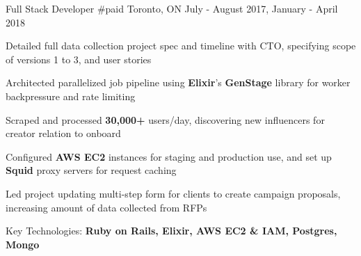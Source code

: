 

\begin{cventries}

  \cventry
    {Full Stack Developer} %
    {\#paid} %
    {Toronto, ON} %
    {July - August 2017, January - April 2018} %
    {
      \begin{cvitems} %
        \item {Detailed full data collection project spec and timeline with CTO, specifying scope of versions 1 to 3, and user stories}
        \item {Architected parallelized job pipeline using \textbf{Elixir}'s \textbf{GenStage} library for worker backpressure and rate limiting}
        \item {Scraped and processed \textbf{30,000+} users/day, discovering new influencers for creator relation to onboard}
        \item {Configured \textbf{AWS EC2} instances for staging and production use, and set up \textbf{Squid} proxy servers for request caching}
        \item {Led project updating multi-step form for clients to create campaign proposals, increasing amount of data collected from RFPs}
        \item {Key Technologies: \textbf{Ruby on Rails, Elixir, AWS EC2 \& IAM, Postgres, Mongo}}
      \end{cvitems}
    }

\end{cventries}
